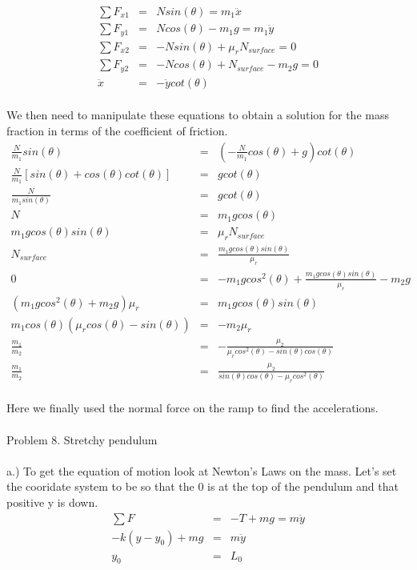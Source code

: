\documentclass[11pt]{amsart}
\begin{document}
\begin{eqnarray*}
\sum{F_{x1}} &=& Nsin(\theta) = m_{1}\ddot{x} \\
\sum{F_{y1}} &=& Ncos(\theta)-m_{1}g = m_{1}\ddot{y} \\
\sum{F_{x2}} &=& -Nsin(\theta) +\mu_{r}N_{surface} = 0 \\
\sum{F_{y2}} &=& -Ncos(\theta)+N_{surface}-m_{2}g =0 \\
\ddot{x} &=& -\ddot{y}cot(\theta) 
\end{eqnarray*} \\
We then need to manipulate these equations to obtain a solution for the mass fraction in terms of the coefficient of friction. \\
\begin{eqnarray*} 
\frac{N}{m_{1}}sin(\theta) &=& (-\frac{N}{m_{1}}cos(\theta)+g)cot(\theta) \\
\frac{N}{m_{1}}[sin(\theta)+cos(\theta)cot(\theta)] &=& gcot(\theta) \\
\frac{N}{m_{1}sin(\theta)} &=& gcot(\theta) \\
N &=& m_{1}gcos(\theta) \\
m_{1}gcos(\theta)sin(\theta) &=& \mu_{r}N_{surface} \\
N_{surface} &=& \frac{m_{1}gcos(\theta)sin(\theta)}{\mu_{r}} \\
0 &=& -m_{1}gcos^{2}(\theta) +\frac{m_{1}gcos(\theta)sin(\theta)}{\mu_{r}} -m_{2}g \\
(m_{1}gcos^{2}(\theta)+m_{2}g)\mu_{r} &=& m_{1}gcos(\theta)sin(\theta) \\
m_{1}cos(\theta)(\mu_{r}cos(\theta)-sin(\theta)) &=& -m_{2}\mu_{r} \\
\frac{m_{1}}{m_{2}} &=& -\frac{\mu_{2}}{\mu_{r}cos^{2}(\theta)-sin(\theta)cos(\theta)} \\
\frac{m_{1}}{m_{2}} &=& \frac{\mu_{2}}{sin(\theta)cos(\theta)-\mu_{r}cos^{2}(\theta)} 
\end{eqnarray*} \\
Here we finally used the normal force on the ramp to find the accelerations. \\ \\
Problem 8. Stretchy pendulum \\ \\
a.) To get the equation of motion look at Newton's Laws on the mass. Let's set the cooridate system to be so that the 0 is at the top of the pendulum and that positive y is down. \\
\begin{eqnarray*} 
\sum{F} &=& -T+mg = m\ddot{y} \\
-k(y-y_{0})+mg &=& m\ddot{y} \\
y_{0} &=& L_{0} 
\end{eqnarray*} \\
\end{document}
